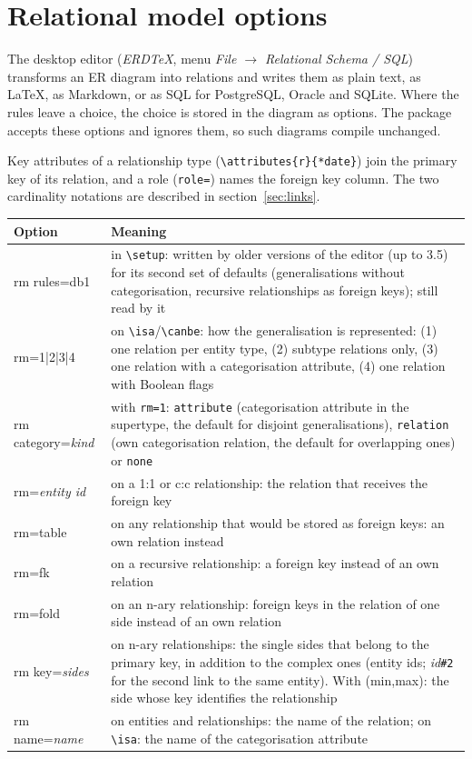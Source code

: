 \documentclass[10pt,a4paper]{article}
\newcommand\cs[1]{\texttt{\textbackslash#1}}
\newcommand\meta[1]{\textlangle\textit{#1}\textrangle}
\begin{document}
\section{Relational model options}\label{sec:rm}

The desktop editor (\emph{ERDTeX}, menu \emph{File $\to$
Relational Schema / SQL}) transforms an ER diagram into relations and writes
them as plain text, as LaTeX, as Markdown, or as SQL for PostgreSQL, Oracle and SQLite. Where
the rules leave a choice, the choice is stored in the diagram as options. The
package accepts these options and ignores them, so such diagrams compile
unchanged.

Key attributes of a relationship type
(\verb|\attributes{r}{*date}|) join the primary key of its relation, and a role
(\verb|role=|) names the foreign key column. The two cardinality notations are described in section~\ref{sec:links}.

\begin{longtable}{@{}>{\ttfamily}p{4.4cm}p{11.4cm}@{}}
\toprule
\normalfont\textbf{Option} & \textbf{Meaning}\\\midrule
rm rules=db1 & in \cs{setup}: written by older versions of the editor (up to 3.5) for its
  second set of defaults (generalisations without categorisation, recursive
  relationships as foreign keys); still read by it\\
rm=1|2|3|4 & on \cs{isa}/\cs{canbe}: how the generalisation is represented: (1) one relation per entity type, (2) subtype
  relations only, (3) one relation with a categorisation attribute,
  (4) one relation with Boolean flags\\
rm category=\meta{kind} & with \texttt{rm=1}: \texttt{attribute}
  (categorisation attribute in the supertype, the default for disjoint
  generalisations), \texttt{relation} (own categorisation relation, the
  default for overlapping ones) or \texttt{none}\\
rm=\meta{entity id} & on a 1:1 or c:c relationship: the relation that
  receives the foreign key\\
rm=table & on any relationship that would be stored as foreign keys: an own
  relation instead\\
rm=fk & on a recursive relationship: a foreign key instead of an own
  relation\\
rm=fold & on an n-ary relationship: foreign keys in the relation of one side
  instead of an own relation\\
rm key=\meta{sides} & on n-ary relationships: the single sides that belong to
  the primary key, in addition to the complex ones (entity ids;
  \meta{id}\texttt{\#2} for the second link to the same entity). With (min,max):
  the side whose key identifies the relationship\\
rm name=\meta{name} & on entities and relationships: the name of the
  relation; on \cs{isa}: the name of the categorisation attribute\\
\bottomrule
\end{longtable}
\end{document}
